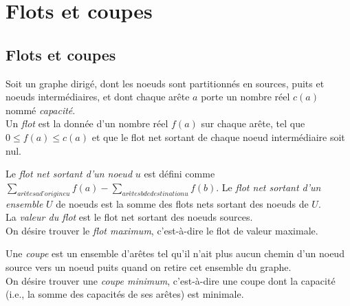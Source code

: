\section{Flots et coupes}
\subsection{Flots et coupes}
\begin{mydef}
  Soit un graphe dirigé, dont les noeuds sont partitionnés en sources, puits et noeuds intermédiaires, et dont chaque arête $a$ porte un nombre réel $c(a)$ nommé \emph{capacité}.\\
  Un \emph{flot} est la donnée d’un nombre réel $f(a)$ sur chaque arête, tel que $0 \leq f(a) \leq c(a)$ et que le flot net sortant de chaque noeud intermédiaire soit nul.
\end{mydef}

\begin{mydef}
  Le \emph{flot net sortant d’un noeud} $u$ est défini comme $\sum_{arêtes a d’origine u} f(a) − \sum_{arêtes b de destination u} f(b)$. Le \emph{flot net sortant d’un ensemble} $U$ de noeuds est la somme des flots nets sortant des noeuds de $U$.\\
  La \emph{valeur du flot} est le flot net sortant des noeuds sources.\\
  On désire trouver le \emph{flot maximum}, c’est-à-dire le flot de valeur maximale.
\end{mydef}

\begin{mydef}
  Une \emph{coupe} est un ensemble d’arêtes tel qu’il n’ait plus aucun chemin d’un noeud source vers un noeud puits quand on retire cet ensemble du graphe.\\
  On désire trouver une \emph{coupe minimum}, c’est-à-dire une coupe dont la capacité (i.e., la somme des capacités de ses arêtes) est minimale.
\end{mydef}

\begin{center}
\end{center}

